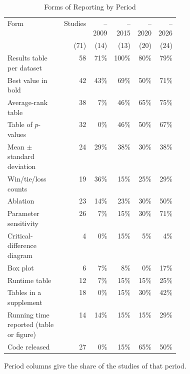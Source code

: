 \begin{table}[t]
  \caption{Forms of Reporting by Period}
  \label{tab:empirical-reporting-era}
  \footnotesize
  \setlength{\tabcolsep}{4pt}
  \begin{tabular}{@{}>{\raggedright\arraybackslash}p{0.4\linewidth}rrrrr@{}}
    \toprule
    Form & Studies & --2009 & --2015 & --2020 & --2026\\
    & (71) & (14) & (13) & (20) & (24)\\
    \midrule
    Results table per dataset & 58 & 71\% & 100\% & 80\% & 79\%\\
    Best value in bold & 42 & 43\% & 69\% & 50\% & 71\%\\
    Average-rank table & 38 & 7\% & 46\% & 65\% & 75\%\\
    Table of $p$-values & 32 & 0\% & 46\% & 50\% & 67\%\\
    Mean $\pm$ standard deviation & 24 & 29\% & 38\% & 30\% & 38\%\\
    Win/tie/loss counts & 19 & 36\% & 15\% & 25\% & 29\%\\
    Ablation & 23 & 14\% & 23\% & 30\% & 50\%\\
    Parameter sensitivity & 26 & 7\% & 15\% & 30\% & 71\%\\
    Critical-difference diagram & 4 & 0\% & 15\% & 5\% & 4\%\\
    Box plot & 6 & 7\% & 8\% & 0\% & 17\%\\
    Runtime table & 12 & 7\% & 15\% & 15\% & 25\%\\
    Tables in a supplement & 18 & 0\% & 15\% & 30\% & 42\%\\
    \midrule
    Running time reported (table or figure) & 14 & 14\% & 15\% & 15\% & 29\%\\
    Code released & 27 & 0\% & 15\% & 65\% & 50\%\\
    \bottomrule
  \end{tabular}
  \par\smallskip\raggedright\scriptsize Period columns give the share of the studies of that period.
\end{table}

